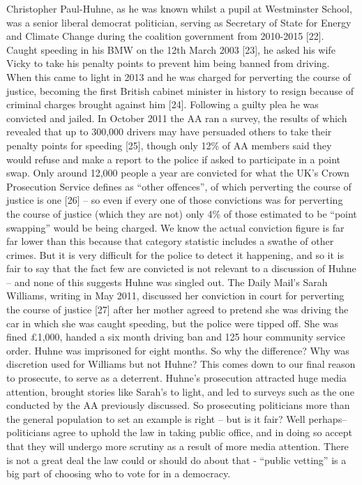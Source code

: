 \documentclass[11pt,a4paper]{report}
\begin{document}
\begin{multicols}{2}
		Christopher Paul-Huhne, as he was known whilst a pupil at Westminster School, was a senior liberal democrat politician, serving as Secretary of State for Energy and Climate Change during the coalition government from 2010-2015 [22]. Caught speeding in his BMW on the 12th March 2003 [23], he asked his wife Vicky to take his penalty points to prevent him being banned from driving. When this came to light in 2013 and he was charged for perverting the course of justice, becoming the first British cabinet minister in history to resign because of criminal charges brought against him [24]. Following a guilty plea he was convicted and jailed. In October 2011 the AA ran a survey, the results of which revealed that up to 300,000 drivers may have persuaded others to take their penalty points for speeding [25], though only 12\% of AA members said they would refuse and make a report to the police if asked to participate in a point swap. Only around 12,000 people a year are convicted for what the UK’s Crown Prosecution Service defines as “other offences”, of which perverting the course of justice is one [26] – so even if every one of those convictions was for perverting the course of justice (which they are not) only 4\% of those estimated to be “point swapping” would be being charged. We know the actual conviction figure is far far lower than this because that category statistic includes a swathe of other crimes. But it is very difficult for the police to detect it happening, and so it is fair to say that the fact few are convicted is not relevant to a discussion of Huhne – and none of this suggests Huhne was singled out. The Daily Mail’s Sarah Williams, writing in May 2011, discussed her conviction in court for perverting the course of justice [27] after her mother agreed to pretend she was driving the car in which she was caught speeding, but the police were tipped off. She was fined £1,000, handed a six month driving ban and 125 hour community service order. Huhne was imprisoned for eight months. So why the difference? Why was discretion used for Williams but not Huhne? This comes down to our final reason to prosecute, to serve as a deterrent. Huhne’s prosecution attracted huge media attention, brought stories like Sarah’s to light, and led to surveys such as the one conducted by the AA previously discussed. So prosecuting politicians more than the general population to set an example is right – but is it fair? Well perhaps– politicians agree to uphold the law in taking public office, and in doing so accept that they will undergo more scrutiny as a result of more media attention. There is not a great deal the law could or should do about that - “public vetting” is a big part of choosing who to vote for in a democracy. 
		

\end{multicols}
\end{document}
